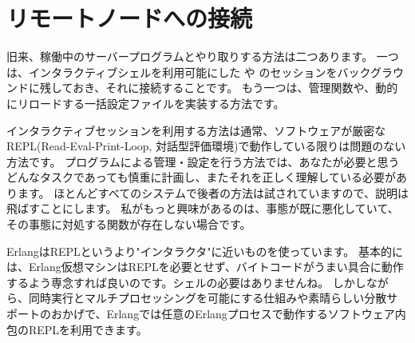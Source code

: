\chapter{リモートノードへの接続}
\label{chap:connecting}

旧来、稼働中のサーバープログラムとやり取りする方法は二つあります。
一つは、インタラクティブシェルを利用可能にした や  のセッションをバックグラウンドに残しておき、それに接続することです。
もう一つは、管理関数や、動的にリロードする一括設定ファイルを実装する方法です。

インタラクティブセッションを利用する方法は通常、ソフトウェアが厳密なREPL(Read-Eval-Print-Loop, 対話型評価環境)で動作している限りは問題のない方法です。
プログラムによる管理・設定を行う方法では、あなたが必要と思うどんなタスクであっても慎重に計画し、またそれを正しく理解している必要があります。
ほとんどすべてのシステムで後者の方法は試されていますので、説明は飛ばすことにします。
私がもっと興味があるのは、事態が既に悪化していて、その事態に対処する関数が存在しない場合です。

ErlangはREPLというより"インタラクタ"に近いものを使っています。
基本的には、Erlang仮想マシンはREPLを必要とせず、バイトコードがうまい具合に動作するよう専念すれば良いのです。シェルの必要はありませんね。
しかしながら、同時実行とマルチプロセッシングを可能にする仕組みや素晴らしい分散サポートのおかげで、Erlangでは任意のErlangプロセスで動作するソフトウェア内包のREPLを利用できます。

